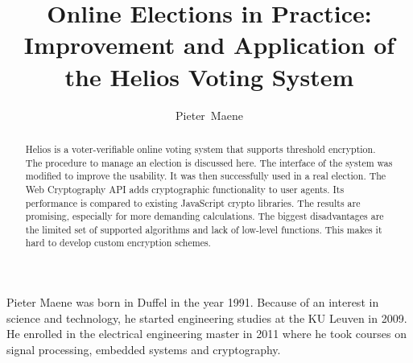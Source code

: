 \documentclass[a4paper,journal]{IEEEtran}
\begin{document}
  

  \title{Online Elections in Practice: Improvement and Application of the Helios Voting System}
  \author{Pieter~Maene}

  \maketitle
  
  \begin{abstract}
    Helios is a voter-verifiable online voting system that supports threshold encryption. The procedure to manage an election is discussed here. The interface of the system was modified to improve the usability. It was then successfully used in a real election. The Web Cryptography API adds cryptographic functionality to user agents. Its performance is compared to existing JavaScript crypto libraries. The results are promising, especially for more demanding calculations. The biggest disadvantages are the limited set of supported algorithms and lack of low-level functions. This makes it hard to develop custom encryption schemes.
  \end{abstract}
  
  
  
  
  
  
  
  
  
  

  \begin{IEEEbiography}{Pieter Maene} was born in Duffel in the year 1991. Because of an interest in science and technology, he started engineering studies at the KU Leuven in 2009. He enrolled in the electrical engineering master in 2011 where he took courses on signal processing, embedded systems and cryptography.
  \end{IEEEbiography}
\end{document}

